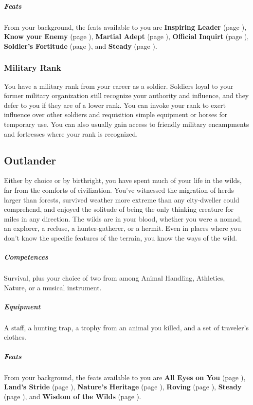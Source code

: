     \subparagraph{Feats} From your background, the feats available to you are
    \textbf{Inspiring Leader} (page \pageref{feat::inspiringleader}),
    \textbf{Know your Enemy} (page \pageref{feat::knowyourenemy}),
    \textbf{Martial Adept} (page \pageref{feat::martialadept}),
    \textbf{Official Inquirt} (page \pageref{feat::officialinquiry}),
    \textbf{Soldier's Fortitude} (page \pageref{feat::soldiersfortitude}), and
    \textbf{Steady} (page \pageref{feat::steady}).

    \subsubsection{Military Rank}
        You have a military rank from your career as a soldier.
        Soldiers loyal to your former military organization still recognize your authority and influence, and they defer to you if they are of a lower rank.
        You can invoke your rank to exert influence over other soldiers and requisition simple equipment or horses for temporary use.
        You can also usually gain access to friendly military encampments and fortresses where your rank is recognized.

\subsection*{Outlander} \label{ssec::outlander}
    Either by choice or by birthright, you have spent much of your life in the wilds, far from the comforts of civilization.
    You've witnessed the migration of herds larger than forests, survived weather more extreme than any city-dweller could comprehend, and enjoyed the solitude of being the only thinking creature for miles in any direction.
    The wilds are in your blood, whether you were a nomad, an explorer, a recluse, a hunter-gatherer, or a hermit.
    Even in places where you don't know the specific features of the terrain, you know the ways of the wild.

    \subparagraph{Competences} Survival, plus your choice of two from among Animal Handling, Athletics, Nature, or a musical instrument.

    \subparagraph{Equipment} A staff, a hunting trap, a trophy from an animal you killed, and a set of traveler's clothes.

    \subparagraph{Feats} From your background, the feats available to you are
    \textbf{All Eyes on You} (page \pageref{feat::alleyesonyou}),
    \textbf{Land's Stride} (page \pageref{feat::landsstride}),
    \textbf{Nature's Heritage} (page \pageref{feat::naturesheritage}),
    \textbf{Roving} (page \pageref{feat::roving}),
    \textbf{Steady} (page \pageref{feat::steady}), and
    \textbf{Wisdom of the Wilds} (page \pageref{feat::wisdomofthewilds}).

